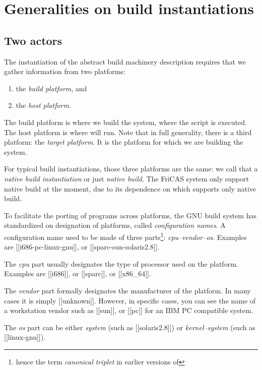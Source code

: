 \documentclass[12pt]{article}
\begin{document}
\section{Generalities on build instantiations}

\subsection{Two actors}

The instantiation of the abstract build machinery description requires
that we gather information from two platforms:
\begin{enumerate}
\item the \emph{build platform}, and
\item the \emph{host platform}.
\end{enumerate}

The build platform is where we build the system, \eg{} where
the  script is executed.  The host platform
is where  will run.  Note that in full generality, there is
a third platform: the \emph{target platform}.  It is the platform for which
we are building the system.

For typical build instantiations, those  three  platforms are the same: we
call that a \emph{native build instantiation} or just \emph{native build}.
The FriCAS system only support native build at the moment, due to its
dependence on  which supports only native build.

To facilitate the porting of programs across platforms, the GNU build
system has standardized on designation of platforms, called
\emph{configuration names}.  A configuration name used to be
made of three parts\footnote{hence the term \emph{canonical triplet} in
    earlier versions of }:
\textsl{cpu--vendor--os}.  Examples are
[[i686-pc-linux-gnu]], or [[sparc-sun-solaris2.8]].

The \textsl{cpu}
part usually designates the type of processor used on the platform.
Examples are [[i686]], or [[sparc]], or [[x86_64]].

The \textsl{vendor} part formally designates the manufacturer of
the platform.  In many cases it is simply [[unknown]].  However,
in specific cases, you can see the name of a workstation vendor such
as [[sun]], or [[pc]] for an IBM PC compatible system.

The \textsl{os} part can be either \textsl{system} (such as [[solaris2.8]])
or \textsl{kernel--system} (such as [[linux-gnu]]).
\end{document}
